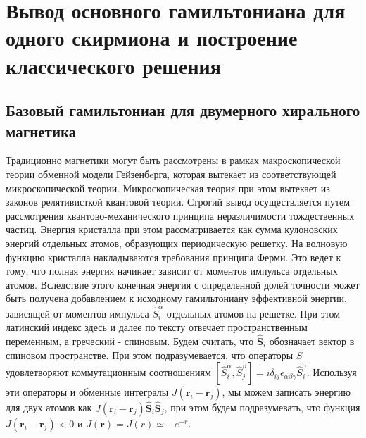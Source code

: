 \documentclass[a4paper,article,14pt]{extarticle}
\begin{document}
\pagebreak
\section{Вывод основного гамильтониана для одного скирмиона и построение классического решения}
\subsection{Базовый гамильтониан для двумерного хирального магнетика}

Традиционно магнетики могут быть рассмотрены в рамках макроскопической теории обменной модели Гейзенбeрга, которая вытекает из соответствующей микроскопической теории. Микроскопическая теория при этом вытекает из законов релятивисткой квантовой теории.  Строгий вывод осуществляется путем рассмотрения квантово-механического принципа неразличимости тождественных частиц. Энергия кристалла при этом рассматривается как сумма кулоновских энергий отдельных атомов, образующих периодическую решетку. На волновую функцию кристалла накладываются требования принципа Ферми. Это ведет к тому, что полная энергия начинает зависит от моментов импульса отдельных атомов. Вследствие этого конечная энергия с определенной долей точности может быть получена добавлением к исходному гамильтониану эффективной энергии, зависящей от моментов импульса $\widehat{S}_i^\alpha$ отдельных атомов на решетке. При этом латинский индекс здесь и далее по тексту отвечает пространственным переменным, а греческий - спиновым. Будем считать, что $\widehat {\mathbf{S}}_{i}$ обозначает вектор в спиновом пространстве. При этом подразумевается, что операторы $\widehat{S}$ удовлетворяют коммутационным соотношениям $[\widehat{S}_i^\alpha, \widehat{S}_j^\beta]=i \delta_{ij} \epsilon_{\alpha \beta \gamma} \widehat{S}_i^\gamma $. Используя эти операторы и  обменные интегралы $J(\mathbf{r}_i - \mathbf{r}_j)$, мы можем записать энергию для двух атомов как $J\left(\mathbf{r}_i - \mathbf{r}_j \right){{\widehat {\mathbf{S}}}_i}{{\widehat {\mathbf{S}}}_j}$, при этом будем подразумевать, что функция $J\left(\mathbf{r}_i - \mathbf{r}_j \right)<0$ и $J(\mathbf{r})=J(r)\simeq -e^{-r}$.
\end{document}
